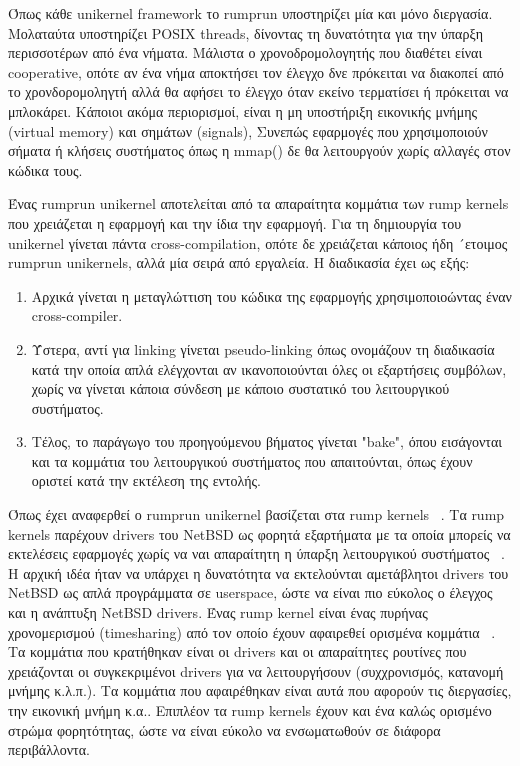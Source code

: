 Όπως κάθε unikernel framework το rumprun υποστηρίζει μία και μόνο διεργασία.
Μολαταύτα υποστηρίζει POSIX threads, δίνοντας τη δυνατότητα για την ύπαρξη
περισσοτέρων από ένα νήματα. Μάλιστα ο χρονοδρομολογητής που διαθέτει είναι
cooperative, οπότε αν ένα νήμα αποκτήσει τον έλεγχο δνε πρόκειται να διακοπεί
από το χρονδορομοληγτή αλλά θα αφήσει το έλεγχο όταν εκείνο τερματίσει ή
πρόκειται να μπλοκάρει. Κάποιοι ακόμα περιορισμοί, είναι η μη υποστήριξη
εικονικής μνήμης (virtual memory) και σημάτων (signals), Συνεπώς εφαρμογές που
χρησιμοποιούν σήματα ή κλήσεις συστήματος όπως η mmap() δε θα λειτουργούν χωρίς αλλαγές στον κώδικα τους.

Ένας rumprun unikernel αποτελείται από τα απαραίτητα κομμάτια των rump kernels
που χρειάζεται η εφαρμογή και την ίδια την εφαρμογή. Για τη δημιουργία του
unikernel γίνεται πάντα cross-compilation, οπότε δε χρειάζεται κάποιος ήδη
´ετοιμος rumprun unikernels, αλλά μία σειρά από εργαλεία. H διαδικασία έχει ως
εξής:
\begin{enumerate}
	\item Αρχικά γίνεται η μεταγλώττιση του κώδικα της εφαρμογής
		χρησιμοποιοώντας έναν cross-compiler.
	\item Ύστερα, αντί για linking γίνεται pseudo-linking όπως ονομάζουν τη
		διαδικασία κατά την οποία απλά ελέγχονται αν ικανοποιούνται όλες
		οι εξαρτήσεις συμβόλων, χωρίς να γίνεται κάποια σύνδεση με
		κάποιο συστατικό του λειτουργικού συστήματος.
	\item Τέλος, το παράγωγο του προηγούμενου βήματος γίνεται "bake", όπου
		εισάγονται και τα κομμάτια του λειτουργικού συστήματος που
		απαιτούνται, όπως έχουν οριστεί κατά την εκτέλεση της εντολής.
\end{enumerate}

Όπως έχει αναφερθεί ο rumprun unikernel βασίζεται στα rump kernels
~\cite{rumprun_Xen}. Τα rump kernels παρέχουν drivers του NetBSD ως φορητά
εξαρτήματα με τα οποία μπορείς να εκτελέσεις εφαρμογές χωρίς να ναι απαραίτητη η
ύπαρξη λειτουργικού συστήματος ~\cite{kantee2014rump}. Η αρχική ιδέα ήταν να
υπάρχει η δυνατότητα να εκτελούνται αμετάβλητοι drivers του NetBSD ως απλά
προγράμματα σε userspace, ώστε να είναι πιο εύκολος ο έλεγχος και η ανάπτυξη
NetBSD drivers. Ένας rump kernel είναι ένας πυρήνας χρονομερισμού (timesharing)
από τον οποίο έχουν αφαιρεθεί ορισμένα κομμάτια ~\cite{kantee2012design}. Τα
κομμάτια που κρατήθηκαν είναι οι drivers και οι απαραίτητες ρουτίνες που
χρειάζονται οι συγκεκριμένοι drivers για να λειτουργήσουν (συχχρονισμός,
κατανομή μνήμης κ.λ.π.). Τα κομμάτια που αφαιρέθηκαν είναι αυτά που αφορούν τις
διεργασίες, την εικονική μνήμη κ.α.. Επιπλέον τα rump kernels έχουν και ένα
καλώς ορισμένο στρώμα φορητότητας, ώστε να είναι εύκολο να ενσωματωθούν σε
διάφορα περιβάλλοντα.

